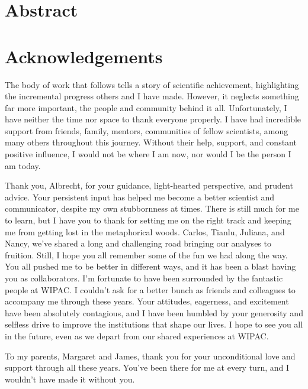 \documentclass[oneside, letterpaper, 10pt, oldfontcommands]{memoir}
\begin{document}
\frontmatter

\thetitlepage
\cleardoublepage
\setcounter{page}{1}

\section{Abstract}
\uwabstract
\cleardoublepage

\section{Acknowledgements}

The body of work that follows tells a story of scientific achievement, highlighting the incremental progress others and I have made. However, it neglects something far more important, the people and community behind it all. Unfortunately, I have neither the time nor space to thank everyone properly. I have had incredible support from friends, family, mentors, communities of fellow scientists, among many others throughout this journey. Without their help, support, and constant positive influence, I would not be where I am now, nor would I be the person I am today.

Thank you, Albrecht, for your guidance, light-hearted perspective, and prudent advice. Your persistent input has helped me become a better scientist and communicator, despite my own stubbornness at times. There is still much for me to learn, but I have you to thank for setting me on the right track and keeping me from getting lost in the metaphorical woods. Carlos, Tianlu, Juliana, and Nancy, we've shared a long and challenging road bringing our analyses to fruition. Still, I hope you all remember some of the fun we had along the way. You all pushed me to be better in different ways, and it has been a blast having you as collaborators. I'm fortunate to have been surrounded by the fantastic people at WIPAC. I couldn't ask for a better bunch as friends and colleagues to accompany me through these years. Your attitudes, eagerness, and excitement have been absolutely contagious, and I have been humbled by your generosity and selfless drive to improve the institutions that shape our lives. I hope to see you all in the future, even as we depart from our shared experiences at WIPAC.

To my parents, Margaret and James, thank you for your unconditional love and support through all these years. You've been there for me at every turn, and I wouldn't have made it without you.
\end{document}
